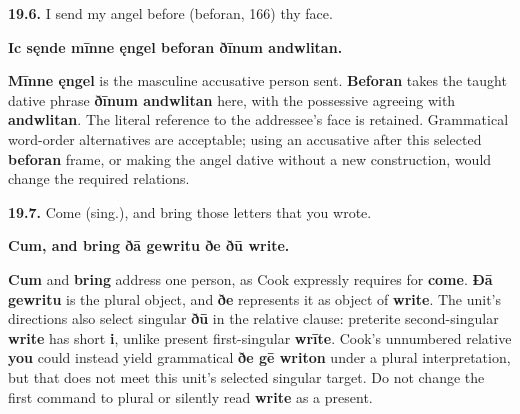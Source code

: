 \par\begin{minipage}{\linewidth}\raggedright
\textbf{19.6.} I send my angel before (beforan, 166) thy face.

\textbf{Ic sęnde mīnne ęngel beforan ðīnum andwlitan.}

\textbf{Mīnne ęngel} is the masculine accusative person sent. \textbf{Beforan} takes the taught dative phrase \textbf{ðīnum andwlitan} here, with the possessive agreeing with \textbf{andwlitan}. The literal reference to the addressee's face is retained. Grammatical word-order alternatives are acceptable; using an accusative after this selected \textbf{beforan} frame, or making the angel dative without a new construction, would change the required relations.

\end{minipage}\par\addvspace{4pt}

\par\begin{minipage}{\linewidth}\raggedright
\textbf{19.7.} Come (sing.), and bring those letters that you wrote.

\textbf{Cum, and bring ðā gewritu ðe ðū write.}

\textbf{Cum} and \textbf{bring} address one person, as Cook expressly requires for \textbf{come}. \textbf{Ðā gewritu} is the plural object, and \textbf{ðe} represents it as object of \textbf{write}. The unit's directions also select singular \textbf{ðū} in the relative clause: preterite second-singular \textbf{write} has short \textbf{i}, unlike present first-singular \textbf{wrīte}. Cook's unnumbered relative \textbf{you} could instead yield grammatical \textbf{ðe gē writon} under a plural interpretation, but that does not meet this unit's selected singular target. Do not change the first command to plural or silently read \textbf{write} as a present.

\end{minipage}\par\addvspace{4pt}

